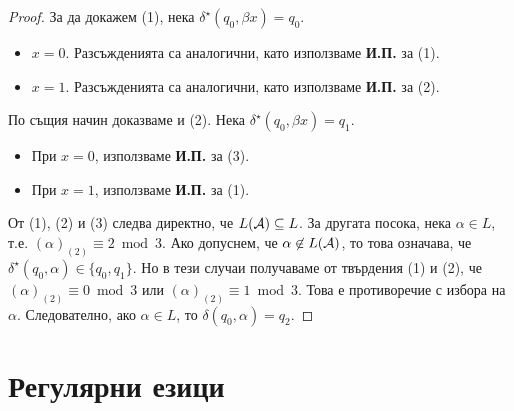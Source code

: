 \begin{proof}
  За да докажем (1), нека $\delta^\star(q_0,\beta x) = q_0$. 
  \begin{itemize}
  \item 
    $x = 0$. Разсъжденията са аналогични, като използваме {\bf И.П.} за (1).
  \item
    $x = 1$. Разсъжденията са аналогични, като използваме {\bf И.П.} за (2).
  \end{itemize}
  
  По същия начин доказваме и (2). Нека $\delta^\star(q_0,\beta x) = q_1$. 
  \begin{itemize}
  \item 
    При $x = 0$, използваме {\bf И.П.} за (3).
  \item
    При $x = 1$, използваме {\bf И.П.} за (1).
  \end{itemize}

  От (1), (2) и (3) следва директно, че $L(\mathcal{A}) \subseteq L$.
  За другата посока, нека $\alpha \in L$, т.е. $(\alpha)_{(2)} \equiv 2 \bmod 3$.
  Ако допуснем, че $\alpha \not\in L(\mathcal{A})$, то това означава, че $\delta^\star(q_0,\alpha) \in \{q_0,q_1\}$.
  Но в тези случаи получаваме от твърдения (1) и (2), че $(\alpha)_{(2)} \equiv 0 \bmod 3$ или $(\alpha)_{(2)} \equiv 1 \bmod 3$.
  Това е противоречие с избора на $\alpha$. Следователно, ако $\alpha \in L$, то $\delta(q_0,\alpha) = q_2$.
\end{proof}

\section{Регулярни езици}

